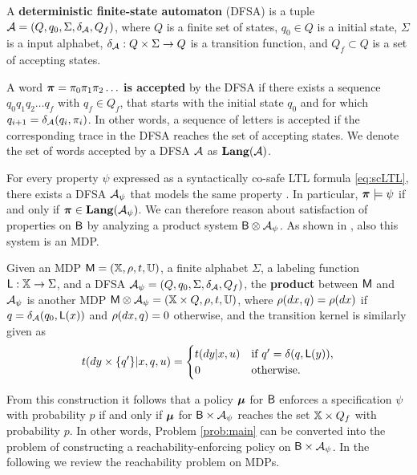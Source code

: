 \documentclass{ifacconf}
\begin{document}
\begin{definition}
  A \textbf{deterministic finite-state automaton} (DFSA) is a tuple $\mathcal{A} = (Q, q_0, \Sigma, \delta_{\mathcal{A}}, Q_f)$, where $Q$ is a finite set of states, $q_0 \in Q$ is a initial state, $\Sigma$ is a input alphabet, $\delta_{\mathcal{A}} : Q \times \Sigma \rightarrow Q$ is a transition function, and $Q_f\subset Q$ is a set of accepting states.

  A word ${\boldsymbol{\pi}} = \pi_0 \pi_1 \pi_2 \ldots$ \textbf{is accepted} by the DFSA if there exists a sequence $q_0 q_1 q_2 \ldots q_f$ with $q_f\in Q_f$, that starts with the initial state $q_0$ and for which $q_{i+1}=\delta_{\mathcal{A}}(q_i,\pi_i)$. In other words, a sequence of letters is accepted if the corresponding trace in the DFSA reaches the set of accepting states. We denote the set of words accepted by a DFSA $\mathcal{A}$ as $\mathbf{Lang} (\mathcal A)$.
\end{definition}

For every property $\psi$ expressed as a syntactically co-safe LTL formula \eqref{eq:scLTL}, there exists a DFSA  $\mathcal{A}_\psi$ that models the same property \citep{Belta2017}. In particular, ${\boldsymbol{\pi}}\models\psi$ if and only if ${\boldsymbol{\pi}}\in \mathbf{Lang}(\mathcal{A}_\psi)$. We can therefore reason about satisfaction of properties on $\mathsf{B}$ by analyzing a product system $\mathsf{B} \otimes \mathcal{A}_\psi$. As shown in \citep{tmka2013}, also this system is an MDP.

\begin{definition}
\label{def:product}
  Given an MDP $\mathsf{M} = ({\mathbb{X}}, \rho, t, {\mathbb{U}})$, a finite alphabet $\Sigma$, a labeling function $\mathsf{L} : {\mathbb{X}}\rightarrow\Sigma$, and a DFSA  $\mathcal{A}_\psi = (Q, q_0, \Sigma, \delta_{\mathcal{A}}, Q_f)$, the \textbf{product} between $\mathsf{M}$ and $\mathcal{A}_\psi$ is another MDP $\mathsf{M}\otimes\mathcal{A}_\psi = ({\mathbb{X}} \times Q, \relax\rho, \relax{t}, {\mathbb{U}})$, where $\relax\rho(dx,q) = \rho(dx)$ if $q= \delta_{\mathcal{A}}(q_0,\mathsf L(x))$ and $ \relax\rho(dx,q) =0$ otherwise, and the transition kernel is similarly given as  
  \begin{equation*}
    \relax{t}(d y\times\{q'\}|x,q,u) = \begin{cases}t(dy|x,u)& \text{if } q' =\delta(q,\mathsf{L}(y)),\\ 0 & \text{otherwise.}  \end{cases}
  \end{equation*} 
\end{definition}

From this construction it follows that a policy ${\boldsymbol{\mu}}$ for $\mathsf{B}$ enforces a specification $\psi$ with probability $p$ if and only if ${\boldsymbol{\mu}}$ for $\mathsf{B} \times \mathcal{A}_\psi$ reaches the set ${\mathbb{X}} \times Q_f$ with probability $p$. In other words, Problem \ref{prob:main} can be converted into the problem of constructing a reachability-enforcing policy on $\mathsf{B} \times \mathcal{A}_\psi$. In the following we review the reachability problem on MDPs.
\end{document}
